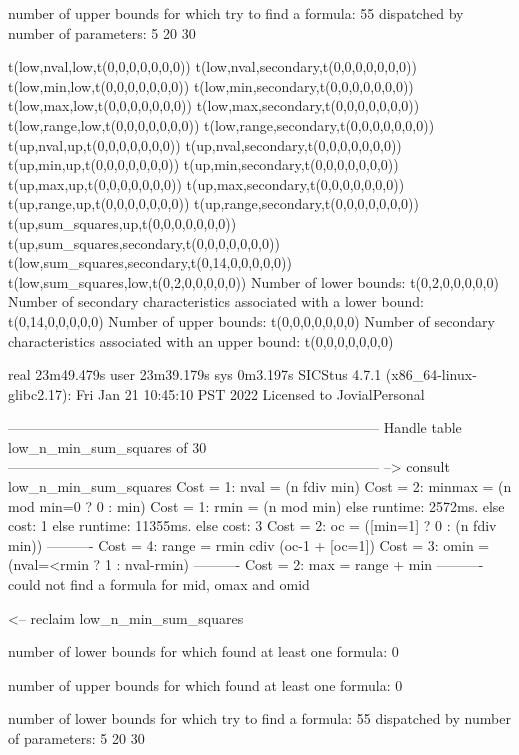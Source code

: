 number of upper bounds for which try to find a formula: 55
dispatched by number of parameters: 5  20  30

t(low,nval,low,t(0,0,0,0,0,0,0))
t(low,nval,secondary,t(0,0,0,0,0,0,0))
t(low,min,low,t(0,0,0,0,0,0,0))
t(low,min,secondary,t(0,0,0,0,0,0,0))
t(low,max,low,t(0,0,0,0,0,0,0))
t(low,max,secondary,t(0,0,0,0,0,0,0))
t(low,range,low,t(0,0,0,0,0,0,0))
t(low,range,secondary,t(0,0,0,0,0,0,0))
t(up,nval,up,t(0,0,0,0,0,0,0))
t(up,nval,secondary,t(0,0,0,0,0,0,0))
t(up,min,up,t(0,0,0,0,0,0,0))
t(up,min,secondary,t(0,0,0,0,0,0,0))
t(up,max,up,t(0,0,0,0,0,0,0))
t(up,max,secondary,t(0,0,0,0,0,0,0))
t(up,range,up,t(0,0,0,0,0,0,0))
t(up,range,secondary,t(0,0,0,0,0,0,0))
t(up,sum_squares,up,t(0,0,0,0,0,0,0))
t(up,sum_squares,secondary,t(0,0,0,0,0,0,0))
t(low,sum_squares,secondary,t(0,14,0,0,0,0,0))
t(low,sum_squares,low,t(0,2,0,0,0,0,0))
Number of lower bounds:                                             t(0,2,0,0,0,0,0)
Number of secondary characteristics associated with a lower bound:  t(0,14,0,0,0,0,0)
Number of upper bounds:                                             t(0,0,0,0,0,0,0)
Number of secondary characteristics associated with an upper bound: t(0,0,0,0,0,0,0)

real	23m49.479s
user	23m39.179s
sys	0m3.197s
SICStus 4.7.1 (x86_64-linux-glibc2.17): Fri Jan 21 10:45:10 PST 2022
Licensed to JovialPersonal


--------------------------------------------------------------------------------
Handle table low_n_min_sum_squares of 30
--------------------------------------------------------------------------------
--> consult low_n_min_sum_squares
Cost =  1:  nval   = (n fdiv min)
Cost =  2:  minmax = (n mod min=0 ? 0 : min)
Cost =  1:  rmin   = (n mod min)
else runtime: 2572ms. else cost: 1
else runtime: 11355ms. else cost: 3
Cost =  2:  oc     = ([min=1] ? 0 : (n fdiv min)) %
----------
Cost =  4:  range  = rmin cdiv (oc-1 + [oc=1]) %
Cost =  3:  omin   = (nval=<rmin ? 1 : nval-rmin)
----------
Cost =  2:  max    = range + min
----------
could not find a formula for mid, omax and omid

<-- reclaim low_n_min_sum_squares

number of lower bounds for which found at least one formula: 0

number of upper bounds for which found at least one formula: 0

number of lower bounds for which try to find a formula: 55
dispatched by number of parameters: 5  20  30

